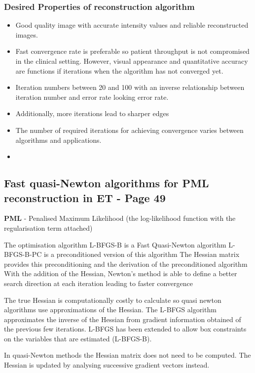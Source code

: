 \documentclass{article}
\begin{document}
\subsubsection{Desired Properties of reconstruction algorithm }
\begin{itemize}
\item Good quality image with accurate intensity values and reliable reconstructed images. 
\item Fast convergence rate is preferable so patient throughput is not compromised in the clinical setting. However, visual appearance and quantitative accuracy are functions if iterations when the algorithm has not converged yet.
\item Iteration numbers between 20 and 100 with an inverse relationship between iteration number and error rate looking error rate.
\item Additionally, more iterations lead to sharper edges
\item The number of required iterations for achieving convergence varies between algorithms and applications.
\item 
\end{itemize}




\subsection{Fast quasi-Newton algorithms for PML reconstruction in ET - Page 49}
\textbf{PML} - Penalised Maximum Likelihood (the log-likelihood function with the regularisation term attached)


The optimisation algorithm L-BFGS-B is a Fast Quasi-Newton algorithm
L-BFGS-B-PC is a preconditioned version of this algorithm
The Hessian matrix provides this preconditioning and the derivation of the preconditioned algorithm
With the addition of the Hessian, Newton's method is able to define a better search direction at each iteration leading to faster convergence

The true Hessian is computationally costly to calculate so quasi newton algorithms use approximations of the Hessian. The L-BFGS algorithm approximates the inverse of the Hessian from gradient information obtained of the previous few iterations. L-BFGS has been extended to allow box constraints on the variables that are estimated (L-BFGS-B).

In quasi-Newton methods the Hessian matrix does not need to be computed. The Hessian is updated by analysing successive gradient vectors instead.
\end{document}
